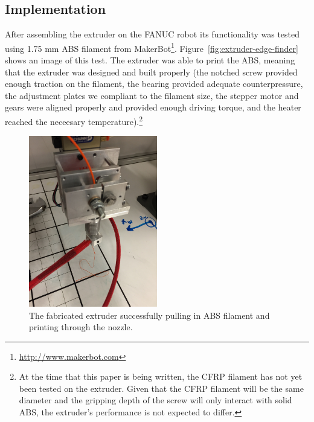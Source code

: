 \clearpage

\subsection{Implementation}

\indent

After assembling the extruder on the FANUC robot its functionality was tested using 1.75 mm ABS filament from MakerBot\footnote{\url{http://www.makerbot.com}}. Figure~\ref{fig:extruder-edge-finder} shows an image of this test. The extruder was able to print the ABS, meaning that the extruder was designed and built properly (the notched screw provided enough traction on the filament, the bearing provided adequate counterpressure, the adjustment plates we compliant to the filament size, the stepper motor and gears were aligned properly and provided enough driving torque, and the heater reached the neceesary temperature).\footnote{At the time that this paper is being written, the CFRP filament has not yet been tested on the extruder. Given that the CFRP filament will be the same diameter and the gripping depth of the screw will only interact with solid ABS, the extruder's performance is not expected to differ.}\\

\begin{figure}[h!]
\centering
\includegraphics[width=0.5\textwidth]{./figures/extruder-abs-extrude}
\caption{The fabricated extruder successfully pulling in ABS filament and printing through the nozzle.}
\label{fig:extruder-abs-extrude}
\end{figure}
